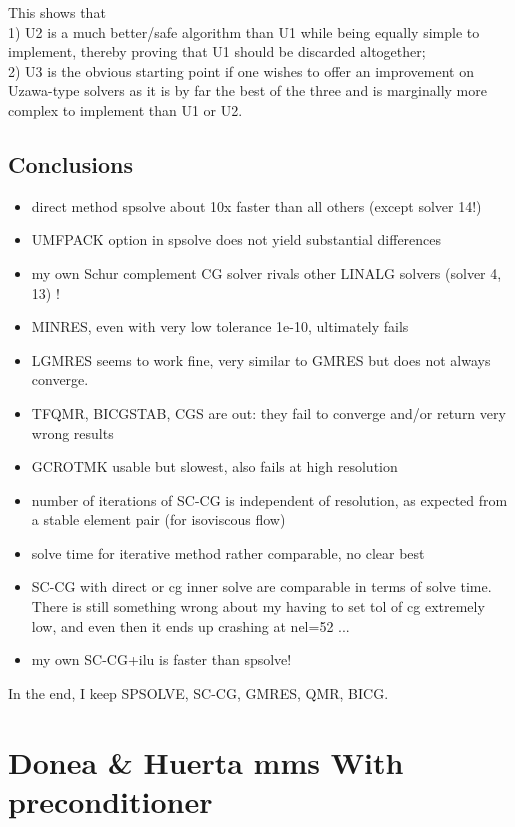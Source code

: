 This shows that\\
1) U2 is a much better/safe algorithm than U1 while being equally simple to implement, thereby proving that U1
 should be discarded altogether; \\
2) U3 is the obvious starting point if one wishes to offer an improvement on Uzawa-type solvers as it is by far the best of the three and is marginally more complex to implement than U1 or U2.






\newpage
\subsection*{Conclusions}

\begin{itemize}
\item direct method spsolve about 10x faster than all others (except solver 14!)
\item UMFPACK option in spsolve does not yield substantial differences
\item my own Schur complement CG solver rivals other LINALG solvers (solver 4, 13) ! 
\item MINRES, even with very low tolerance 1e-10, ultimately fails
\item LGMRES seems to work fine, very similar to GMRES but does not always converge.
\item TFQMR, BICGSTAB, CGS are out: they fail to converge and/or return 
very wrong results
\item GCROTMK usable but slowest, also fails at high resolution 
\item number of iterations of SC-CG is independent of resolution, as expected
from a stable element pair (for isoviscous flow)
\item solve time for iterative method rather comparable, no clear best
\item SC-CG with direct or cg inner solve are comparable in terms of 
solve time. There is still something wrong about my having to 
set tol of cg extremely low, and even then it ends up crashing at nel=52 ...
\item my own SC-CG+ilu is faster than spsolve!
\end{itemize}

In the end, I keep SPSOLVE, SC-CG, GMRES, QMR, BICG.

\newpage
\section*{Donea \& Huerta mms With preconditioner}


